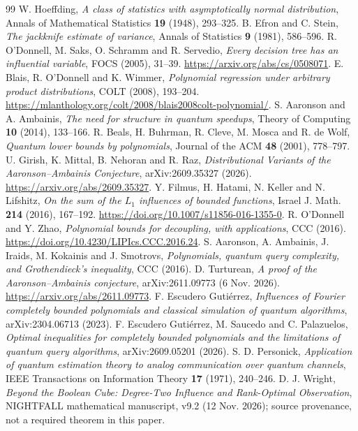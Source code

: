 \documentclass[11pt,letterpaper]{article}
\theoremstyle{definition}
\begin{document}
\begin{thebibliography}{99}\setlength{\itemsep}{4pt}
 W. Hoeffding,
\emph{A class of statistics with asymptotically normal distribution},
Annals of Mathematical Statistics \textbf{19} (1948), 293--325.
 B. Efron and C. Stein,
\emph{The jackknife estimate of variance},
Annals of Statistics \textbf{9} (1981), 586--596.
 R. O'Donnell, M. Saks, O. Schramm and R. Servedio,
\emph{Every decision tree has an influential variable},
FOCS (2005), 31--39.
\url{https://arxiv.org/abs/cs/0508071}.
 E. Blais, R. O'Donnell and K. Wimmer,
\emph{Polynomial regression under arbitrary product distributions},
COLT (2008), 193--204.
\url{https://mlanthology.org/colt/2008/blais2008colt-polynomial/}.
 S. Aaronson and A. Ambainis,
\emph{The need for structure in quantum speedups},
Theory of Computing \textbf{10} (2014), 133--166.
 R. Beals, H. Buhrman, R. Cleve, M. Mosca and R. de Wolf,
\emph{Quantum lower bounds by polynomials}, Journal of the ACM
\textbf{48} (2001), 778--797.
 U. Girish, K. Mittal, B. Nehoran and R. Raz,
\emph{Distributional Variants of the Aaronson--Ambainis Conjecture},
arXiv:2609.35327 (2026).
\url{https://arxiv.org/abs/2609.35327}.
 Y. Filmus, H. Hatami, N. Keller and N. Lifshitz,
\emph{On the sum of the $L_1$ influences of bounded functions},
Israel J. Math. \textbf{214} (2016), 167--192.
\url{https://doi.org/10.1007/s11856-016-1355-0}.
 R. O'Donnell and Y. Zhao,
\emph{Polynomial bounds for decoupling, with applications},
CCC (2016). \url{https://doi.org/10.4230/LIPIcs.CCC.2016.24}.
 S. Aaronson, A. Ambainis, J. Iraids,
M. Kokainis and J. Smotrovs,
\emph{Polynomials, quantum query complexity, and Grothendieck's inequality},
CCC (2016).
 D. Turturean,
\emph{A proof of the Aaronson--Ambainis conjecture},
arXiv:2611.09773 (6 Nov. 2026).
\url{https://arxiv.org/abs/2611.09773}.
 F. Escudero Guti\'errez,
\emph{Influences of Fourier completely bounded polynomials and classical simulation of quantum algorithms},
arXiv:2304.06713 (2023).
 F. Escudero Guti\'errez, M. Saucedo and C. Palazuelos,
\emph{Optimal inequalities for completely bounded polynomials and the limitations of quantum query algorithms},
arXiv:2609.05201 (2026).
 S. D. Personick,
\emph{Application of quantum estimation theory to analog communication over quantum channels},
IEEE Transactions on Information Theory \textbf{17} (1971), 240--246.
 D. J. Wright,
\emph{Beyond the Boolean Cube: Degree-Two Influence and Rank-Optimal Observation},
NIGHTFALL mathematical manuscript, v9.2 (12 Nov. 2026); source provenance,
not a required theorem in this paper.
\end{thebibliography}
\end{document}

